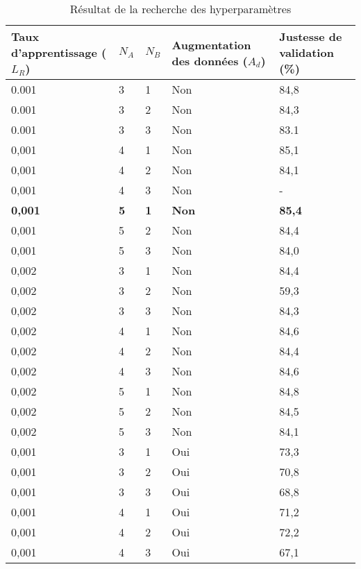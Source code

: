     \begin{longtable}{p{4cm}p{1cm}p{1cm}p{3.5cm}p{4cm}}
        \caption{Résultat de la recherche des hyperparamètres}\\
        \hline
        Taux d'apprentissage (\(L_R\)) & \(N_A\) & \(N_B\) & Augmentation des données (\(A_d\)) & Justesse de validation (\%) \\
        \hline\hline
        0.001 & 3 & 1 & Non & 84,8\\
        0.001 & 3 & 2 & Non & 84,3\\
        0.001 & 3 & 3 & Non & 83.1\\
        
        0,001 & 4 & 1 & Non & 85,1\\
        0,001 & 4 & 2 & Non & 84,1\\
        0,001 & 4 & 3 & Non & - \\
        
        \textbf{0,001} & \textbf{5} & \textbf{1} & \textbf{Non} & \textbf{85,4}\\
        0,001 & 5 & 2 & Non & 84,4\\
        0,001 & 5 & 3 & Non & 84,0\\
        
        0,002 & 3 & 1 & Non & 84,4\\
        0,002 & 3 & 2 & Non & 59,3\\
        0,002 & 3 & 3 & Non & 84,3\\
        
        0,002 & 4 & 1 & Non & 84,6\\
        0,002 & 4 & 2 & Non & 84,4\\
        0,002 & 4 & 3 & Non & 84,6\\
        
        0,002 & 5 & 1 & Non & 84,8\\
        0,002 & 5 & 2 & Non & 84,5\\
        0,002 & 5 & 3 & Non & 84,1\\
        
        
        0,001 & 3 & 1 & Oui & 73,3\\
        0,001 & 3 & 2 & Oui & 70,8\\
        0,001 & 3 & 3 & Oui & 68,8\\
        
        0,001 & 4 & 1 & Oui & 71,2\\
        0,001 & 4 & 2 & Oui & 72,2\\
        0,001 & 4 & 3 & Oui & 67,1\\
        

\end{longtable}
